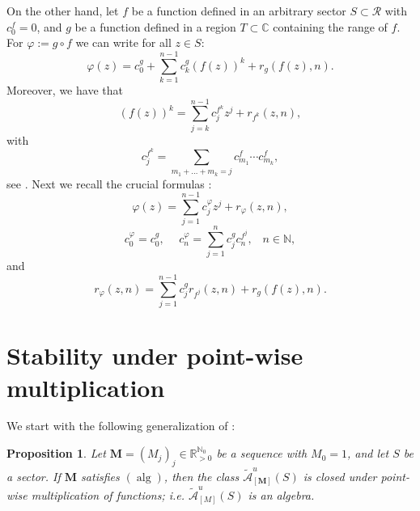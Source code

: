 \documentclass[11pt,a4paper]{article}
\theoremstyle{plain}
\newtheorem{proposition}{Proposition}[section]
\theoremstyle{definition}
\newcommand{\RR}{\mathbb{R}}
\newcommand{\CC}{\mathbb{C}}
\newcommand{\NN}{\mathbb{N}}
\newcommand{\M}{\mathbf{M}}
\let\on=\operatorname
\begin{document}
On the other hand, let $f$ be a function defined in an arbitrary sector $S\subset \mathcal{R}$ with $c_0^f=0$, and $g$ be a function defined in a region $T\subset \CC$ containing the range of $f$. For $\varphi:=g\circ f$ we can write for all $z\in S$:
	$$\varphi(z)=c^g_0+\sum_{k=1}^{n-1}c^g_k(f(z))^k+r_g(f(z),n).$$
	Moreover, we have that
	\begin{equation*}%
		(f(z))^k=\sum_{j=k}^{n-1}c^{f^k}_jz^j+r_{f^k}(z,n),
	\end{equation*}
	with
	\begin{equation}\label{equ71}
		c^{f^k}_j=\sum_{m_1+\dots+m_k=j}c^{f}_{m_1}\cdots c^{f}_{m_k},
	\end{equation}
	see \cite[$(70)$ \& $(71)$]{AubersonMennessier81}. Next we recall the crucial formulas \cite[$(73)$, $(74)$ \& $(75)$]{AubersonMennessier81}:
	\begin{equation*}%
		\varphi(z)=\sum_{j=1}^{n-1}c^\varphi_jz^j+r_{\varphi}(z,n),
	\end{equation*}
	\begin{equation}\label{equ74}
		c^\varphi_0=c^g_0,\hspace{15pt}c^\varphi_n=\sum_{j=1}^{n}c^g_jc^{f^j}_n,\;\;\;n\in\NN,
	\end{equation}
	and
	\begin{equation}\label{eq.equ75.roumieu}
		r_\varphi(z,n)=\sum_{j=1}^{n-1}c^g_jr_{f^j}(z,n)+r_g(f(z),n).
	\end{equation}



\section{Stability under point-wise multiplication}\label{sec.alg}

We start with the following generalization of \cite[Thm. 3]{AubersonMennessier81}:


\begin{proposition}\label{prop.stablepointwiseprop}
Let $\M=(M_j)_j\in\RR_{>0}^{\NN_0}$ be a sequence with $M_0=1$, and let $S$ be a sector. If $\M$ satisfies \hyperlink{s-alg}{$(\on{alg})$}, then the class $\mathcal{\widetilde{A}}^{u}_{[\M]}(S)$ is closed under point-wise multiplication of functions; i.e. $\mathcal{\widetilde{A}}^{u}_{[M]}(S)$ is an algebra. 
\end{proposition}
\end{document}
